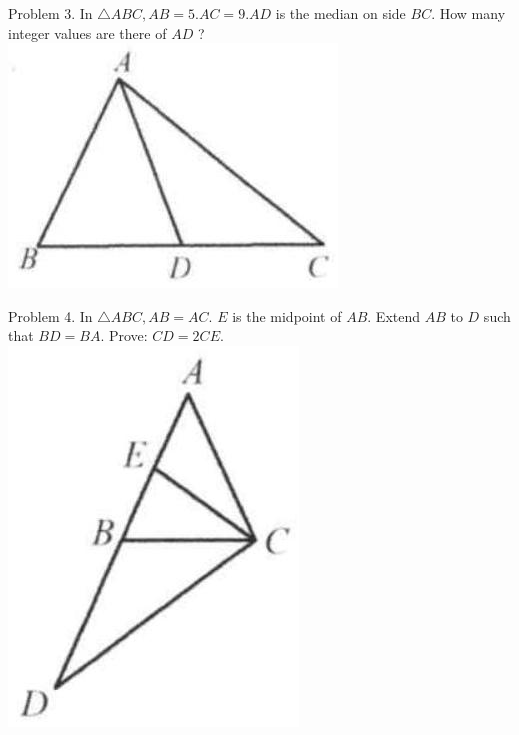 \documentclass[10pt]{article}
\begin{document}
Problem 3. In \(\triangle A B C, A B=5 . A C=9 . A D\) is the median on side \(B C\). How many integer values are there of \(A D\) ?\\
\includegraphics[max width=\textwidth, center]{2025_04_17_97bc1f7e44d93c271a88g-027(2)}

Problem 4. In \(\triangle A B C, A B=A C\). \(E\) is the midpoint of \(A B\). Extend \(A B\) to \(D\) such that \(B D=B A\). Prove: \(C D=2 C E\).\\
\includegraphics[max width=\textwidth, center]{2025_04_17_97bc1f7e44d93c271a88g-027(1)}
\end{document}
